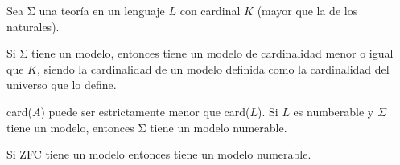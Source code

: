 \begin{theorem}
Sea Σ una teoría en un lenguaje $L$ con cardinal $K$ (mayor que la de los naturales).

Si Σ tiene un modelo, entonces tiene un modelo de cardinalidad menor o igual que $K$, siendo la cardinalidad de un modelo definida como la cardinalidad del universo que lo define.
\end{theorem}

\obs card($A$) puede ser estrictamente menor que card($L$).
\obs Si $L$ es numberable y $Σ$ tiene un modelo, entonces Σ tiene un modelo numerable.

\begin{corol}
Si ZFC tiene un modelo entonces tiene un modelo numerable.
\end{corol}